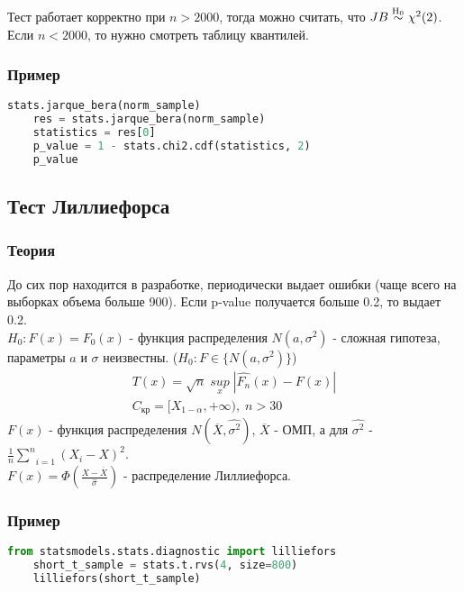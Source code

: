 Тест работает корректно при $n > 2000$, тогда можно считать, что $JB \mathrel{\stackrel{\rm H_0}\sim} \chi^2 (2)$. Если $n < 2000$, то нужно смотреть таблицу квантилей.

\subsubsection*{Пример}\label{cha:compl/sec:nenorm/subsec:ber/subsubsection:prob}

\begin{lstlisting}[language=Python]
	stats.jarque_bera(norm_sample)
	res = stats.jarque_bera(norm_sample)
	statistics = res[0]
	p_value = 1 - stats.chi2.cdf(statistics, 2)
	p_value
\end{lstlisting}

\subsection{Тест Лиллиефорса}\label{cha:compl/sec:norm/subsec:lilli}

\subsubsection*{Теория}\label{cha:compl/sec:norm/subsec:lilli/subsubsection:theory}

До сих пор находится в разработке, периодически выдает ошибки (чаще всего на выборках объема больше 900). Если p-value получается больше 0.2, то выдает 0.2.\\
$H_0: F(x) = F_0 (x)$ - функция распределения $N(a, \sigma^2)$ - сложная гипотеза, параметры $a$ и $\sigma$ неизвестны. ($H_0: F \in \{N(a, \sigma^2)\}$)
$$\begin{gathered}
	T(x) = \sqrt{n} \; \underset{x}{sup} \; |\hat{F_n}(x) - F(x)| \\
	C_{\text{кр}} = [X_{1-\alpha}, +\infty), \; n > 30
\end{gathered}$$
$F(x)$ - функция распределения $N(\overline{X}, \hat{\sigma^2})$, $\overline{X}$ - ОМП, а для $\hat{\sigma^2}$ - $\frac{1}{n}\underset{i=1}{\overset{n}{\sum}}(X_i - X)^2$.\\
$F(x) = \Phi (\frac{X - \overline{X}}{\hat{\sigma}})$ - распределение Лиллиефорса.

\subsubsection*{Пример}\label{cha:compl/sec:nenorm/subsec:lilli/subsubsection:prob}

\begin{lstlisting}[language=Python]
	from statsmodels.stats.diagnostic import lilliefors
	short_t_sample = stats.t.rvs(4, size=800)
	lilliefors(short_t_sample)
\end{lstlisting}

